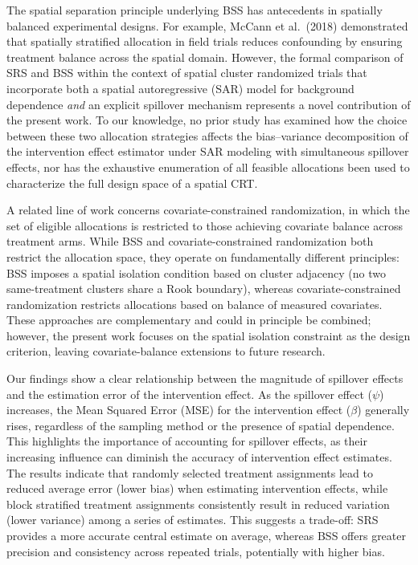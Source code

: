 \documentclass{article}[11pt]
\begin{document}
The spatial separation principle underlying BSS has antecedents in spatially balanced experimental designs. For example, McCann et al.~(2018) demonstrated that spatially stratified allocation in field trials reduces confounding by ensuring treatment balance across the spatial domain\cite{mccann_spatial_2018}. However, the formal comparison of SRS and BSS within the context of spatial cluster randomized trials that incorporate both a spatial autoregressive (SAR) model for background dependence \emph{and} an explicit spillover mechanism represents a novel contribution of the present work. To our knowledge, no prior study has examined how the choice between these two allocation strategies affects the bias--variance decomposition of the intervention effect estimator under SAR modeling with simultaneous spillover effects, nor has the exhaustive enumeration of all feasible allocations been used to characterize the full design space of a spatial CRT.

A related line of work concerns covariate-constrained randomization, in which the set of eligible allocations is restricted to those achieving covariate balance across treatment arms\cite{crisp_covariate-constrained_2023}. While BSS and covariate-constrained randomization both restrict the allocation space, they operate on fundamentally different principles: BSS imposes a spatial isolation condition based on cluster adjacency (no two same-treatment clusters share a Rook boundary), whereas covariate-constrained randomization restricts allocations based on balance of measured covariates. These approaches are complementary and could in principle be combined; however, the present work focuses on the spatial isolation constraint as the design criterion, leaving covariate-balance extensions to future research.

Our findings show a clear relationship between the magnitude of spillover effects and the estimation error of the intervention effect. As the spillover effect ($\psi$) increases, the Mean Squared Error (MSE) for the intervention effect ($\beta$) generally rises, regardless of the sampling method or the presence of spatial dependence. This highlights the importance of accounting for spillover effects, as their increasing influence can diminish the accuracy of intervention effect estimates. The results indicate that randomly selected treatment assignments lead to reduced average error (lower bias) when estimating intervention effects, while block stratified treatment assignments consistently result in reduced variation (lower variance) among a series of estimates. This suggests a trade-off: SRS provides a more accurate central estimate on average, whereas BSS offers greater precision and consistency across repeated trials, potentially with higher bias. 
\end{document}
